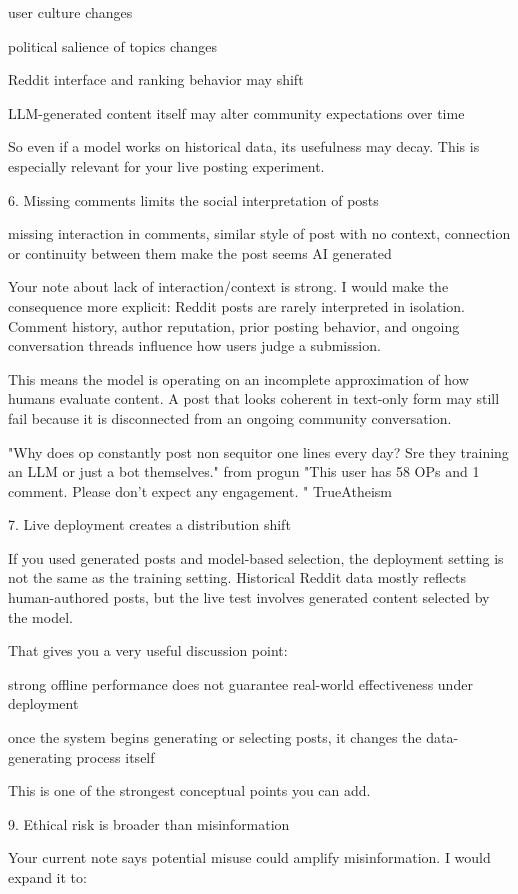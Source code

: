 user culture changes

political salience of topics changes

Reddit interface and ranking behavior may shift

LLM-generated content itself may alter community expectations over time

So even if a model works on historical data, its usefulness may decay. This is especially relevant for your live posting experiment.

6. Missing comments limits the social interpretation of posts

missing interaction in comments, similar style of post with no context, connection or continuity between them make the post seems AI generated

Your note about lack of interaction/context is strong. I would make the consequence more explicit: Reddit posts are rarely interpreted in isolation. Comment history, author reputation, prior posting behavior, and ongoing conversation threads influence how users judge a submission.

This means the model is operating on an incomplete approximation of how humans evaluate content. A post that looks coherent in text-only form may still fail because it is disconnected from an ongoing community conversation.

"Why does op constantly post non sequitor one lines every day? Sre they training an LLM or just a bot themselves." from progun
"This user has 58 OPs and 1 comment. Please don't expect any engagement. " TrueAtheism

7. Live deployment creates a distribution shift

If you used generated posts and model-based selection, the deployment setting is not the same as the training setting. Historical Reddit data mostly reflects human-authored posts, but the live test involves generated content selected by the model.

That gives you a very useful discussion point:

strong offline performance does not guarantee real-world effectiveness under deployment

once the system begins generating or selecting posts, it changes the data-generating process itself

This is one of the strongest conceptual points you can add.


9. Ethical risk is broader than misinformation

Your current note says potential misuse could amplify misinformation. I would expand it to:

